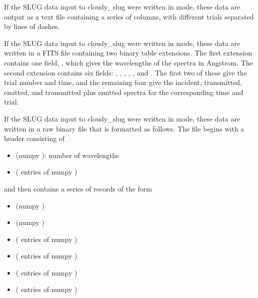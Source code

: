 \documentclass[letterpaper,10pt,english]{sphinxmanual}
\begin{document}
If the SLUG data input to cloudy\_slug were written in  mode,
these data are output as a text file containing a series of columns,
with different trials separated by lines of dashes.

If the SLUG data input to cloudy\_slug were written in  mode,
these data are written in a FITS file containing two binary table
extensions. The first extension contains one field, ,
which gives the wavelengths of the spectra in Angstrom. The second
extension contains six fields: , ,
, , ,
and . The first two of these give
the trial number and time, and the remaining four give the incident,
transmitted, emitted, and transmitted plus emitted spectra for the
corresponding time and trial.

If the SLUG data input to cloudy\_slug were written in  mode,
these data are written in a raw binary file that is formatted as
follows. The file begins with a header consisting of
\begin{itemize}
\item {} 
 (numpy ): number of wavelengths

\item {} 
 ( entries of numpy )

\end{itemize}

and then contains a series of records of the form
\begin{itemize}
\item {} 
 (numpy )

\item {} 
 (numpy )

\item {} 
 ( entries of numpy )

\item {} 
 ( entries of numpy )

\item {} 
 ( entries of numpy )

\item {} 
 ( entries of numpy
)

\end{itemize}
\end{document}
